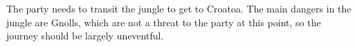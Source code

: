 The party needs to transit the jungle to get to Croatoa.
The main dangers in the jungle are Gnolls, which are not a threat to the party at this point, so the journey should be largely uneventful.
